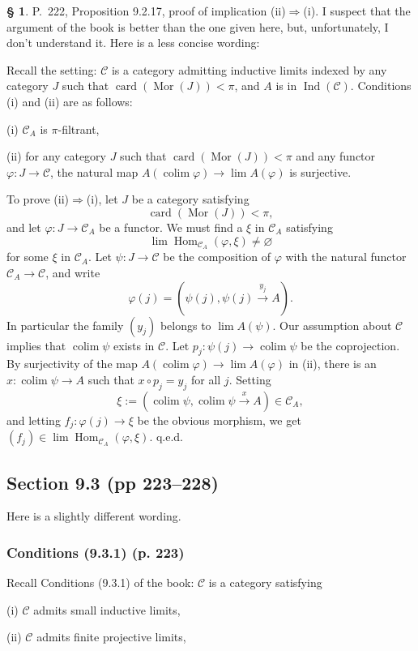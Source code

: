 \documentclass[12pt]{article}%
\theoremstyle{remark}
\theoremstyle{definition}
\newtheorem{s}[thm]{\S}%
\newcommand{\nn}{\noindent}
\newcommand{\C}{\mathcal C}
\newcommand{\pp}{\varphi}
\newcommand{\then}{\Rightarrow}
\newcommand{\xr}{\xrightarrow}
\DeclareMathOperator*{\colim}{colim}%
\DeclareMathOperator{\card}{card}%
\DeclareMathOperator{\Hom}{Hom}%
\DeclareMathOperator{\Ind}{Ind}
\DeclareMathOperator{\Mor}{Mor}
\begin{document}
\begin{s} 
P.~222, Proposition 9.2.17, proof of implication (ii)$\then$(i). I suspect that the argument of the book is better than the one given here, but, unfortunately, I don't understand it. Here is a less concise wording:

Recall the setting: $\C$ is a category admitting inductive limits indexed by any category $J$ such that $\card(\Mor(J))<\pi$, and $A$ is in $\Ind(\C)$. Conditions (i) and (ii) are as follows: 

\nn(i) $\C_A$ is $\pi$-filtrant, 

\nn(ii) for any category $J$ such that $\card(\Mor(J))<\pi$ and any functor $\pp:J\to\C$, the natural map $A(\colim\pp)\to\lim A(\pp)$ is surjective. 

To prove (ii)$\then$(i), let $J$ be a category satisfying 
$$
\card(\Mor(J))<\pi,
$$ 
and let $\pp:J\to\C_A$ be a functor. We must find a $\xi$ in $\C_A$ satisfying 
$$
\lim\Hom_{\C_A}(\pp,\xi)\neq\varnothing
$$ 
for some $\xi$ in $\C_A$. Let $\psi:J\to\C$ be the composition of $\pp$ with the natural functor $\C_A\to\C$, and write 
$$
\pp(j)=(\psi(j),\psi(j)\xr{y_j}A).
$$ 
In particular the family $(y_j)$ belongs to $\lim A(\psi)$. Our assumption about $\C$ implies that $\colim\psi$ exists in $\C$. Let $p_j:\psi(j)\to\colim\psi$ be the coprojection. By surjectivity of the map $A(\colim\pp)\to\lim A(\pp)$ in (ii), there is an $x:\colim\psi\to A$ such that $x\circ p_j=y_j$ for all $j$. Setting 
$$
\xi:=(\colim\psi,\colim\psi\xr x A)\in\C_A,
$$ 
and letting $f_j:\pp(j)\to\xi$ be the obvious morphism, we get $(f_j)\in\lim\Hom_{\C_A}(\pp,\xi)$. q.e.d.
\end{s}


\subsection{Section 9.3 (pp 223--228)}\label{s934}

Here is a slightly different wording. 

\subsubsection{Conditions (9.3.1) (p. 223)}\label{931}

Recall Conditions (9.3.1) of the book: $\C$ is a category satisfying  

(i) $\C$ admits small inductive limits,

(ii) $\C$ admits finite projective limits,
\end{document}
